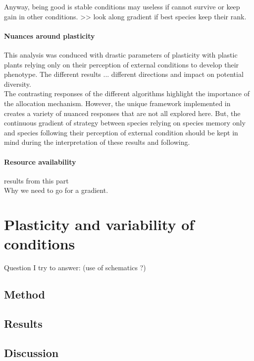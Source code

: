 Anyway, being good is stable conditions may useless if cannot survive or keep gain in other conditions. >> look along gradient if best species keep their rank.\\


\paragraph{Nuances around plasticity}
This analysis was conduced with drastic parameters of plasticity with plastic plants relying only on their perception of external conditions to develop their phenotype. The different results ... different directions and impact on potential diversity.\\
The contrasting responses of the different algorithms highlight the importance of the allocation mechanism. However, the unique framework implemented in \model creates a variety of nuanced responses that are not all explored here. But, the continuous gradient of strategy between species relying on species memory only and species following their perception of external condition should be kept in mind during the interpretation of these results and following.

\paragraph{Resource availability}

results from this part\\
Why we need to go for a gradient.





\section{Plasticity and variability of conditions}
Question I try to answer: (use of schematics ?)

\subsection{Method}

\subsection{Results}

\subsection{Discussion}

